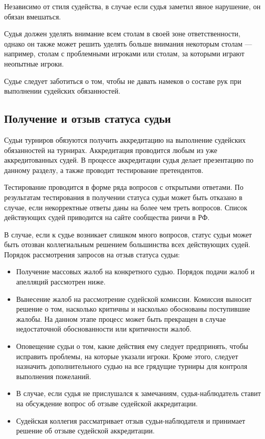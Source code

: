 Независимо от стиля судейства, в случае если судья заметил явное нарушение, он обязан вмешаться.

Судья должен уделять внимание всем столам в своей зоне ответственности, однако он также может решить уделять больше внимания некоторым столам --- например, столам с проблемными игроками или столам, за которыми играют неопытные игроки.

Судье следует заботиться о том, чтобы не давать намеков о составе рук при выполнении судейских обязанностей.

\subsection{Получение и отзыв статуса судьи}

Судьи турниров обязуются получить аккредитацию на выполнение судейских обязанностей на турнирах. Аккредитация проводится любым из уже аккредитованных судей. В процессе аккредитации судья делает презентацию по данному разделу, а также проводит тестирование претендентов.

Тестирование проводится в форме ряда вопросов с открытыми ответами. По результатам тестирования в получении статуса судьи может быть отказано в случае, если некорректные ответы даны на более чем треть вопросов. Список действующих судей приводится на сайте сообщества риичи в РФ.

В случае, если к судье возникает слишком много вопросов, статус судьи может быть отозван коллегиальным решением большинства всех действующих судей. Порядок рассмотрения запросов на отзыв статуса судьи:

\begin{itemize}
	\item Получение массовых жалоб на конкретного судью. Порядок подачи жалоб и апелляций рассмотрен ниже.
	\item Вынесение жалоб на рассмотрение судейской комиссии. Комиссия выносит решение о том, насколько критичны и насколько обоснованы поступившие жалобы. На данном этапе процесс может быть прекращен в случае недостаточной обоснованности или критичности жалоб.
	\item Оповещение судьи о том, какие действия ему следует предпринять, чтобы исправить проблемы, на которые указали игроки. Кроме этого, следует назначить дополнительного судью на все грядущие турниры для контроля выполнения пожеланий.
	\item В случае, если судья не прислушался к замечаниям, судья-наблюдатель ставит на обсуждение вопрос об отзыве судейской аккредитации.
	\item Судейская коллегия рассматривает отзыв судьи-наблюдателя и принимает решение об отзыве судейской аккредитации.
\end{itemize}

